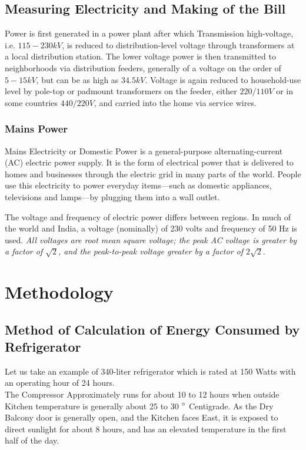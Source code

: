 \documentclass[11pt,a4paper]{article}
\begin{document}
\subsection{Measuring Electricity and Making of the Bill}
Power is first generated in a power plant after which Transmission high-voltage, i.e. $ 115 - 230kV $, is reduced to distribution-level voltage through transformers at a local distribution station. The lower voltage power is then transmitted to neighborhoods via distribution feeders, generally of a voltage on the order of $ 5 - 15 kV $, but can be as high as $ 34.5 kV $.
Voltage is again reduced to household-use level by pole-top or padmount transformers on the feeder, either $ 220/110 V $ or in some countries $ 440/220 V $, and carried into the home via service wires.

\subsubsection{Mains Power}
Mains Electricity or Domestic Power is a general-purpose alternating-current (AC) electric power supply. It is the form of electrical power that is delivered to homes and businesses through the electric grid in many parts of the world. People use this electricity to power everyday items—such as domestic appliances, televisions and lamps—by plugging them into a wall outlet.

The voltage and frequency of electric power differs between regions. In much of the world and India, a voltage (nominally) of 230 volts and frequency of 50 Hz is used. \textit{All voltages are root mean square voltage; the peak AC voltage is greater by a factor of $\sqrt{2}$, and the peak-to-peak voltage greater by a factor of $ 2\sqrt{2}. $}

\section{Methodology}

\subsection{Method of Calculation of Energy Consumed by Refrigerator}
Let us take an example of 340-liter refrigerator which is rated at 150 Watts with an operating hour of 24 hours. \\

\noindent
The Compressor Approximately runs for about 10 to 12 hours when outside Kitchen temperature is generally about 25 to 30 $\degree $ Centigrade. As the Dry Balcony door is generally open, and the Kitchen faces East, it is exposed to direct sunlight for about 8 hours, and has an elevated temperature in the first half of the day. \\
\end{document}
